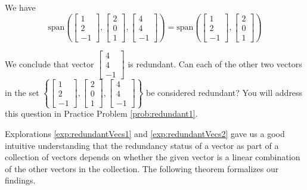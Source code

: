 \documentclass{ximera}
\begin{document}
\begin{exploration}
We have
$$\mbox{span}\left(\begin{bmatrix}1\\2\\-1\end{bmatrix},\begin{bmatrix}2\\0\\1\end{bmatrix},\begin{bmatrix}4\\4\\-1\end{bmatrix}\right)=\mbox{span}\left(\begin{bmatrix}1\\2\\-1\end{bmatrix},\begin{bmatrix}2\\0\\1\end{bmatrix}\right)$$

 We conclude that vector $\begin{bmatrix}4\\4\\-1\end{bmatrix}$ is redundant.  Can each of the other two vectors in the set 
 $\left\{\begin{bmatrix}1\\2\\-1\end{bmatrix},\begin{bmatrix}2\\0\\1\end{bmatrix},\begin{bmatrix}4\\4\\-1\end{bmatrix}\right\}$ be considered redundant?  You will address this question in Practice Problem \ref{prob:redundant1}.
\end{exploration}
 Explorations \ref{exp:redundantVecs1} and \ref{exp:redundantVecs2} gave us a good intuitive understanding that the redundancy status of a vector as part of a collection of vectors depends on whether the given vector is a linear combination of the other vectors in the collection.  The following theorem formalizes our findings.
\end{document}
